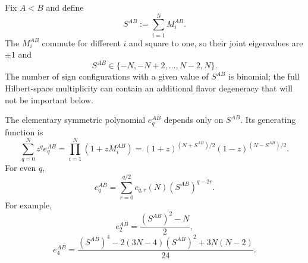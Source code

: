 \documentclass{article}
\theoremstyle{definition}
\begin{document}
Fix $A<B$ and define
\begin{equation}
    S^{AB}:=\sum_{i=1}^N M_i^{AB}.
\end{equation}
The $M_i^{AB}$ commute for different $i$ and square to one, so their joint
eigenvalues are $\pm1$ and
\begin{equation}
    S^{AB}\in\{-N,-N+2,\ldots,N-2,N\}.
\end{equation}
The number of sign configurations with a given value of $S^{AB}$ is
binomial; the full Hilbert-space multiplicity can contain an additional
flavor degeneracy that will not be important below.

The elementary symmetric polynomial $e_q^{AB}$ depends only on $S^{AB}$.
Its generating function is
\begin{equation}
    \sum_{q=0}^N z^q e_q^{AB}
    =\prod_{i=1}^N(1+zM_i^{AB})
    =(1+z)^{(N+S^{AB})/2}
     (1-z)^{(N-S^{AB})/2}.
\end{equation}
For even $q$,
\begin{equation}
    e_q^{AB}
    =\sum_{r=0}^{q/2}c_{q,r}(N)(S^{AB})^{q-2r}.
\end{equation}
For example,
\begin{equation}
    e_2^{AB}=\frac{(S^{AB})^2-N}{2},
\end{equation}
\begin{equation}
    e_4^{AB}
    =\frac{
       (S^{AB})^4-2(3N-4)(S^{AB})^2+3N(N-2)
    }{24}.
\end{equation}
\end{document}
